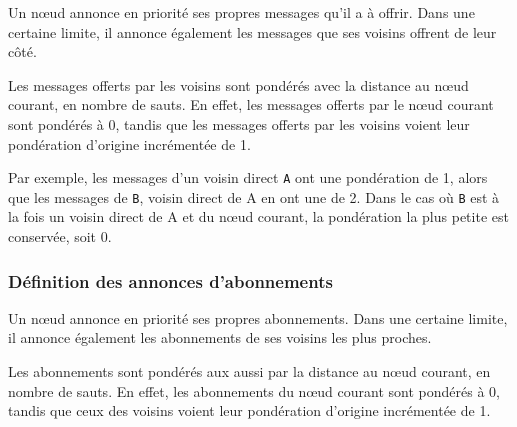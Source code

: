 Un n\oe ud annonce en priorité ses propres messages qu'il a à offrir. Dans une certaine limite, il annonce également les messages que ses voisins offrent de leur c\^oté.

Les messages offerts par les voisins sont pondérés avec la distance au n\oe ud courant, en nombre de sauts. En effet, les messages offerts par le n\oe ud courant sont pondérés à 0, tandis que les messages offerts par les voisins voient leur pondération d'origine incrémentée de 1.

Par exemple, les messages d'un voisin direct \texttt{A} ont une pondération de 1, alors que les messages de \texttt{B}, voisin direct de \textsf{A} en ont une de 2. Dans le cas où \texttt{B} est à la fois un voisin direct de \textsf{A} et du n\oe ud courant, la pondération la plus petite est conservée, soit 0.




\subsubsection{Définition des annonces d'abonnements}

Un n\oe ud annonce en priorité ses propres abonnements. Dans une certaine limite, il annonce également les abonnements de ses voisins les plus proches.

Les abonnements sont pondérés aux aussi par la distance au n\oe ud courant, en nombre de sauts. En effet, les abonnements du n\oe ud courant sont pondérés à 0, tandis que ceux des voisins voient leur pondération d'origine incrémentée de 1.



